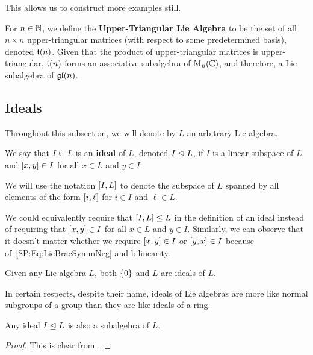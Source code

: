 This allows us to construct more examples still.

\begin{boxexample}
    For $n \in \mathbb{N}$, we define the \textbf{Upper-Triangular Lie Algebra} to be the set of all $n \times n$ upper-triangular matrices (with respect to some predetermined basis), denoted $\mathfrak{t}\!\left( n \right)$. Given that the product of upper-triangular matrices is upper-triangular, $\mathfrak{t}\!\left( n \right)$ forms an associative subalgebra of $\operatorname{M}_{n}\!\left( \mathbb{C} \right)$, and therefore, a Lie subalgebra of $\mathfrak{gl}\!\left( n \right)$.
\end{boxexample}

\subsection{Ideals}

Throughout this subsection, we will denote by $L$ an arbitrary Lie algebra.

\begin{boxdefinition}[Ideal]\label{Ch1:Def:Ideal}
    We say that $I \subseteq L$ is an \textbf{ideal} of $L$, denoted $I \trianglelefteq L$, if $I$ is a linear subspace of $L$ and $\left[ x, y \right] \in I$ for all $x \in L$ and $y \in I$.
\end{boxdefinition}

\begin{boxconvention}
    We will use the notation $\left[ I, L \right]$ to denote the subspace of $L$ spanned by all elements of the form $\left[ i, \ell \right]$ for $i \in I$ and $\ell \in L$.
\end{boxconvention}

\begin{remark}
    We could equivalently require that $\left[ I, L \right]\leq L$ in the definition of an ideal instead of requiring that $\left[ x, y \right] \in I$ for all $x \in L$ and $y \in I$. Similarly, we can observe that it doesn't matter whether we require $\left[ x, y \right] \in I$ or $\left[ y, x \right] \in I$ because of~\eqref{SP:Eq:LieBracSymmNeg} and bilinearity.
\end{remark}

\begin{boxexample}
    Given any Lie algebra $L$, both $\left\{ 0 \right\}$ and $L$ are ideals of $L$.
\end{boxexample}

In certain respects, despite their name, ideals of Lie algebras are more like normal subgroups of a group than they are like ideals of a ring.

\begin{lemma}\label{Ch1:Lemma:IdealSubalg}
    Any ideal $I \trianglelefteq L$ is also a subalgebra of $L$.
\end{lemma}
\begin{proof}
    This is clear from .
\end{proof}

